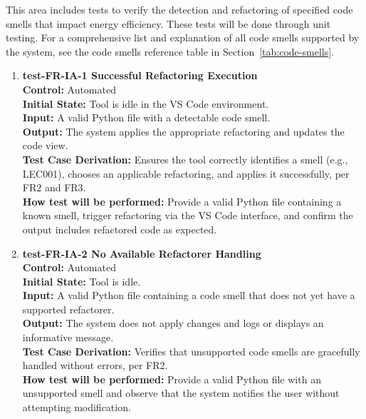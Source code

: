 \documentclass[12pt, titlepage]{article}
\begin{document}
This area includes tests to verify the detection and refactoring of specified code smells that impact energy efficiency. These tests will be done through unit testing. For a comprehensive list and explanation of all code smells supported by the system, see the code smells reference table in Section~\ref{tab:code-smells}.
\begin{enumerate}
  \item \textbf{test-FR-IA-1 Successful Refactoring Execution} \\[2mm]
    \textbf{Control:} Automated \\
    \textbf{Initial State:} Tool is idle in the VS Code environment. \\
    \textbf{Input:} A valid Python file with a detectable code smell. \\
    \textbf{Output:} The system applies the appropriate refactoring and updates the code view. \\
    \textbf{Test Case Derivation:} Ensures the tool correctly identifies a smell (e.g., LEC001), chooses an applicable refactoring, and applies it successfully, per FR2 and FR3. \\
    \textbf{How test will be performed:} Provide a valid Python file containing a known smell, trigger refactoring via the VS Code interface, and confirm the output includes refactored code as expected.

  \item \textbf{test-FR-IA-2 No Available Refactorer Handling} \\[2mm]
    \textbf{Control:} Automated \\
    \textbf{Initial State:} Tool is idle. \\
    \textbf{Input:} A valid Python file containing a code smell that does not yet have a supported refactorer. \\
    \textbf{Output:} The system does not apply changes and logs or displays an informative message. \\
    \textbf{Test Case Derivation:} Verifies that unsupported code smells are gracefully handled without errors, per FR2. \\
    \textbf{How test will be performed:} Provide a valid Python file with an unsupported smell and observe that the system notifies the user without attempting modification.


\end{enumerate}
\end{document}
